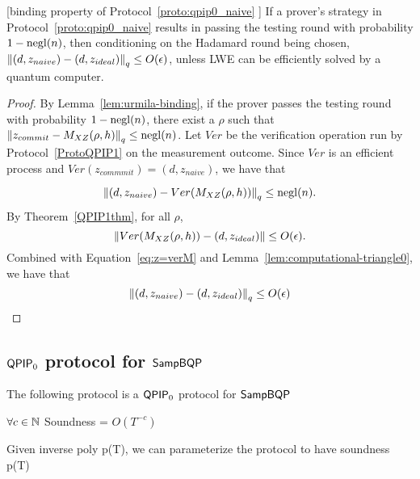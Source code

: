 \begin{lemma}\label{lem:naive-qpip0-binding}[binding property of  Protocol~\ref{proto:qpip0_naive} ]
If a prover's strategy in Protocol~\ref{proto:qpip0_naive} results in passing the testing round with probability $1-\operatorname{negl}(n)$, then conditioning on the Hadamard round being chosen, $\left\lVert(d,z_{naive})-(d,z_{ideal})\right\rVert_q \leq O(\epsilon)$, unless LWE can be efficiently solved by a quantum computer. 
\end{lemma}

\begin{proof}
By Lemma~\ref{lem:urmila-binding}, if the prover passes the testing round with probability $1-\operatorname{negl}(n)$, there exist a $\rho$ such that $\left\lVert z_{commit}- M_{XZ}(\rho,h)\right\rVert_q \leq \operatorname{negl}(n)$. Let $Ver$ be the verification operation run by Protocol~\ref{ProtoQPIP1} on the measurement outcome.  Since $Ver$ is an efficient process and $Ver(z_{commmit})=(d,z_{naive})$, we have that 

\begin{equation} \label{eq:z=verM}
    \left\lVert(d,z_{naive})-Ver( M_{XZ}(\rho,h))\right\rVert_q \leq \operatorname{negl}(n).
\end{equation}
 By Theorem~\ref{QPIP1thm}, for all $\rho$, 
 \begin{equation}
     \left\lVert Ver(M_{XZ}(\rho,h))-(d,z_{ideal})\right\rVert\leq O(\epsilon).
 \end{equation}
   Combined with Equation~\ref{eq:z=verM} and Lemma~\ref{lem:computational-triangle0}, we have that
   \begin{equation}
       \left\lVert(d,z_{naive})-(d,z_{ideal})\right\rVert_q\leq O(\epsilon)
   \end{equation}
\end{proof}


\subsection{$\operatorname{\mathsf{QPIP}}_0$ protocol for $\operatorname{\mathsf{SampBQP}}$}

The following protocol is a $\operatorname{\mathsf{QPIP}}_0$ protocol for $\operatorname{\mathsf{SampBQP}}$

$\forall c\in\mathbb{N}$ Soundness = $O(T^{-c})$

Given inverse poly p(T), we can parameterize the protocol to have soundness p(T)




